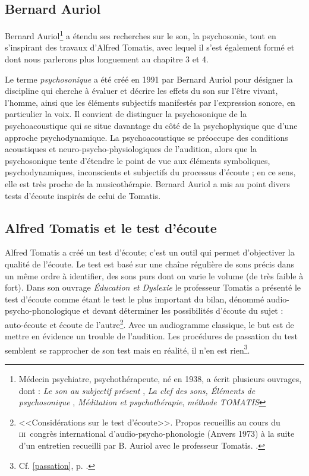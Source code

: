 \subsection{Bernard Auriol}

Bernard Auriol\footnote{Médecin psychiatre, psychothérapeute, 
	né en 1938, a écrit plusieurs ouvrages, dont : \textsl{Le son au subjectif présent} \cite{auriol:son}, \textsl{La clef des sons, Éléments de psychosonique} \cite{auriol:cle}, \textsl{Méditation et
  psychothérapie},  \emph{méthode TOMATIS}} 
a étendu ses recherches sur le son, la psychosonie, 
tout en s'inspirant des
travaux d'Alfred Tomatis, avec lequel il s'est également formé et dont nous parlerons plus longuement au chapitre 3 et 4.

Le terme \emph{psychosonique} a été créé en 1991 par Bernard Auriol pour
désigner la discipline qui cherche à évaluer et décrire les effets du
son sur l'être vivant, l'homme, ainsi que les éléments
subjectifs manifestés par l'expression sonore, en particulier la voix.
Il convient de distinguer la psychosonique de la psychoacoustique qui
se situe davantage du côté de la psychophysique que d'une approche
psychodynamique. La psychoacoustique se préoccupe des conditions
acoustiques et neuro-psycho-physiologiques de l'audition, alors que la
psychosonique tente d'étendre le point de vue aux éléments
symboliques, psychodynamiques, inconscients et subjectifs du processus
d'écoute ;  en ce sens, elle est très proche de la musicothérapie.
Bernard Auriol a mis au point divers tests d'écoute inspirés de celui de Tomatis.
  
\subsection{Alfred Tomatis et le test d'écoute}
  Alfred Tomatis a créé un test d'écoute; c'est un outil qui permet d'objectiver la qualité de l'écoute.
  Le test est  basé sur une chaîne régulière de sons précis dans un même ordre à identifier, des sons purs dont on varie le volume (de très faible à fort). Dans son ouvrage \emph{Éducation et Dyslexie}\autocite{tomatis:education} le professeur Tomatis
  a présenté le test d'écoute comme étant le test le plus important du
  bilan, dénommé audio-psycho-phonologique et devant déterminer les
  possibilités d'écoute du sujet : auto-écoute et écoute de
  l'autre\footnote{<<Considérations sur le test d'écoute>>. Propos
  	recueillis au cours du \textsc{iii}\ieme\ congrès international
  	d'audio-psycho-phonologie (Anvers 1973) à la suite d'un entretien recueilli par B. Auriol
  	avec le professeur Tomatis. \autocite{auriol_stress}.}. 
  Avec un audiogramme classique, le but est de mettre en évidence un trouble de l'audition. Les procédures de passation du test semblent se rapprocher de son test mais en réalité, il n'en est rien\footnote{Cf. \ref{passation}, p. 
  \pageref{passation}.}.
  

